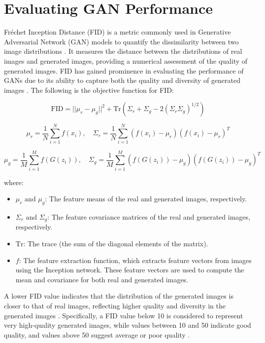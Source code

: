 \section{Evaluating GAN Performance}


Fréchet Inception Distance (FID) is a metric commonly used in Generative Adversarial Network (GAN) models 
to quantify the dissimilarity between two image distributions \citep{10.48550/arxiv.2203.06026}. 
It measures the distance between the distributions of real images and generated images, providing 
a numerical assessment of the quality of generated images. FID has gained prominence in evaluating 
the performance of GANs due to its ability to capture both the quality and diversity of generated images \citep{10.3390/app12157599}.
The following is the objective function for FID:


\begin{equation}
    \text{FID} = || \mu_r - \mu_g ||^2 + \text{Tr}(\Sigma_r + \Sigma_g - 2(\Sigma_r \Sigma_g)^{1/2})
\end{equation}


\begin{equation}
    \mu_r = \frac{1}{N} \sum_{i=1}^{N} f(x_i), \quad \Sigma_r = \frac{1}{N} \sum_{i=1}^{N} (f(x_i) - \mu_r)(f(x_i) - \mu_r)^T
\end{equation}

\begin{equation}
    \mu_g = \frac{1}{M} \sum_{i=1}^{M} f(G(z_i)), \quad \Sigma_g = \frac{1}{M} \sum_{i=1}^{M} (f(G(z_i)) - \mu_g)(f(G(z_i)) - \mu_g)^T
\end{equation}

where:

\begin{itemize}
    \item \(\mu_r \text{ and } \mu_g\): The feature means of the real and generated images, respectively.
    \item \(\Sigma_r \text{ and } \Sigma_g\): The feature covariance matrices of the real and generated images, respectively.
    \item \(\text{Tr}\): The trace (the sum of the diagonal elements of the matrix).
    \item \(f\): The feature extraction function, which extracts feature vectors from images using the Inception network. These feature vectors are used to compute the mean and covariance for both real and generated images.
\end{itemize}

A lower FID value indicates that the distribution of the generated images is closer to that of real images, 
reflecting higher quality and diversity in the generated images \citep{10.1117/12.2673366}. 
Specifically, a FID value below 10 is considered to represent very high-quality generated images, 
while values between 10 and 50 indicate good quality, and values above 50 suggest average or poor quality \citep{10.1117/12.2673366}.



